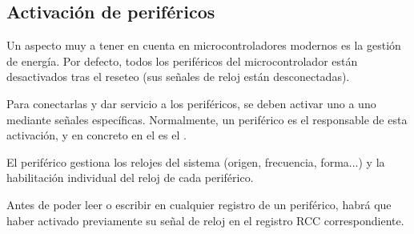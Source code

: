\documentclass[../main.tex]{subfiles}
\begin{document}


        \subsection{Activación de periféricos}
            Un aspecto muy a tener en cuenta en microcontroladores modernos es la gestión de energía. Por defecto, todos los periféricos del microcontrolador están desactivados tras el reseteo (sus señales de reloj están desconectadas).

            Para conectarlas y dar servicio a los periféricos, se deben activar uno a uno mediante señales específicas. Normalmente, un periférico es el responsable de esta activación, y en concreto en el \MCU{} es el  \REFMAN[5].

            El periférico  \REFMAN[5] gestiona los relojes del sistema (origen, frecuencia, forma...) y la habilitación individual del reloj de cada periférico.

            Antes de poder leer o escribir en cualquier registro de un periférico, habrá que haber activado previamente su señal de reloj en el registro RCC correspondiente.
\end{document}
